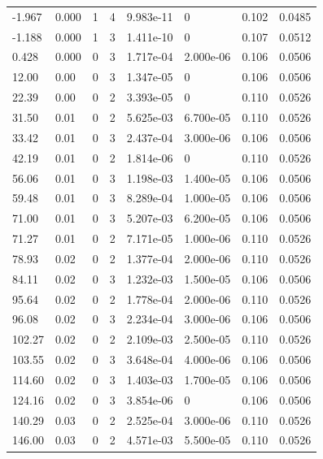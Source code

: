 \documentclass[preview]{standalone}
\begin{document}
{{\begin{tabular}{L{1.2cm}C{1.2cm} C{0.3cm}C{0.5cm} C{1.4cm}C{1.4cm} C{1.4cm}C{1.4cm}}
  -1.967  &  0.000  & 1     &  4 &  9.983e-11  & 0  & 0.102 &  0.0485   \\ 
  -1.188  &  0.000  & 1     &  3 &  1.411e-10  & 0  & 0.107 &  0.0512   \\ 
  0.428  &  0.000  & 0     &  3 &  1.717e-04  & 2.000e-06  & 0.106 &  0.0506   \\ 
  12.00  &  0.00  & 0     &  3 &  1.347e-05  & 0  & 0.106 &  0.0506   \\ 
  22.39  &  0.00  & 0     &  2 &  3.393e-05  & 0  & 0.110 &  0.0526   \\ 
  31.50  &  0.01  & 0     &  2 &  5.625e-03  & 6.700e-05  & 0.110 &  0.0526   \\ 
  33.42  &  0.01  & 0     &  3 &  2.437e-04  & 3.000e-06  & 0.106 &  0.0506   \\ 
  42.19  &  0.01  & 0     &  2 &  1.814e-06  & 0  & 0.110 &  0.0526   \\ 
  56.06  &  0.01  & 0     &  3 &  1.198e-03  & 1.400e-05  & 0.106 &  0.0506   \\ 
  59.48  &  0.01  & 0     &  3 &  8.289e-04  & 1.000e-05  & 0.106 &  0.0506   \\ 
  71.00  &  0.01  & 0     &  3 &  5.207e-03  & 6.200e-05  & 0.106 &  0.0506   \\ 
  71.27  &  0.01  & 0     &  2 &  7.171e-05  & 1.000e-06  & 0.110 &  0.0526   \\ 
  78.93  &  0.02  & 0     &  2 &  1.377e-04  & 2.000e-06  & 0.110 &  0.0526   \\ 
  84.11  &  0.02  & 0     &  3 &  1.232e-03  & 1.500e-05  & 0.106 &  0.0506   \\ 
  95.64  &  0.02  & 0     &  2 &  1.778e-04  & 2.000e-06  & 0.110 &  0.0526   \\ 
  96.08  &  0.02  & 0     &  3 &  2.234e-04  & 3.000e-06  & 0.106 &  0.0506   \\ 
  102.27  &  0.02  & 0     &  2 &  2.109e-03  & 2.500e-05  & 0.110 &  0.0526   \\ 
  103.55  &  0.02  & 0     &  3 &  3.648e-04  & 4.000e-06  & 0.106 &  0.0506   \\ 
  114.60  &  0.02  & 0     &  3 &  1.403e-03  & 1.700e-05  & 0.106 &  0.0506   \\ 
  124.16  &  0.02  & 0     &  3 &  3.854e-06  & 0  & 0.106 &  0.0506   \\ 
  140.29  &  0.03  & 0     &  2 &  2.525e-04  & 3.000e-06  & 0.110 &  0.0526   \\ 
  146.00  &  0.03  & 0     &  2 &  4.571e-03  & 5.500e-05  & 0.110 &  0.0526   \\ 

\end{tabular}}}
\end{document}
